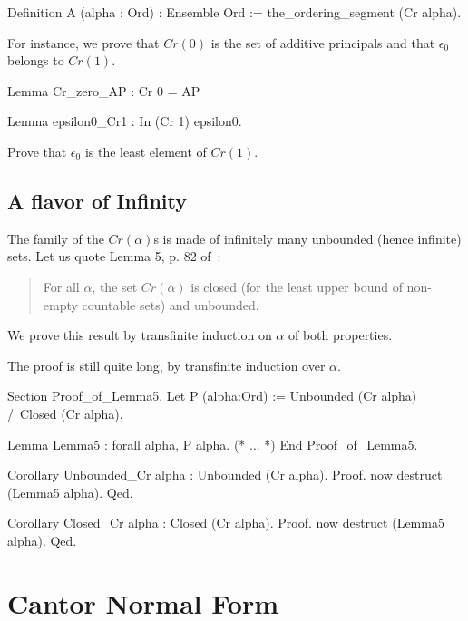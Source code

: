 {\begin{Coqsrc}
Definition A (alpha : Ord) : Ensemble Ord :=
  the_ordering_segment (Cr alpha).
\end{Coqsrc}

For instance,  we prove that $\textit{Cr}(0)$ is the set of additive principals and that $\epsilon_0$
belongs to $\textit{Cr}(1)$.

\begin{Coqsrc}
Lemma Cr_zero_AP :  Cr 0 = AP

Lemma epsilon0_Cr1 : In (Cr 1) epsilon0.
\end{Coqsrc}


\begin{exercise}
 Prove that $\epsilon_0$ is the least element of $\textit{Cr}(1)$.
\end{exercise}


\subsection{A flavor of Infinity}



The family of the $\textit{Cr}(\alpha)$s is made of infinitely many unbounded (hence infinite) sets.
Let us quote Lemma 5, p. 82  of~\cite{schutte}:
\begin{quote}
  For all $\alpha$, the set $\textit{Cr}(\alpha)$ is closed (for the least upper bound of non-empty countable sets) and unbounded.
\end{quote}

We prove this result by transfinite induction on $\alpha$ of both properties.

The proof is still quite long, by transfinite induction over $\alpha$.



\begin{Coqsrc}
Section Proof_of_Lemma5.
  Let P (alpha:Ord) := Unbounded (Cr alpha) /\ Closed (Cr alpha).
 
 Lemma Lemma5 : forall alpha, P alpha.
(* ... *)
 End Proof_of_Lemma5.

Corollary Unbounded_Cr alpha : Unbounded (Cr alpha).
Proof.
  now destruct (Lemma5 alpha).
Qed.

Corollary Closed_Cr alpha : Closed (Cr alpha).
Proof.
  now destruct (Lemma5 alpha).
Qed.
\end{Coqsrc}

\section{Cantor Normal Form}

}
